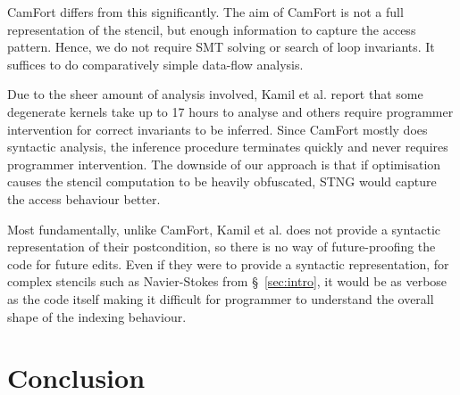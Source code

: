 \documentclass[10pt,preprint]{sigplanconf}
\theoremstyle{definition}
\begin{document}

CamFort differs from this significantly. The aim of CamFort is not a
full representation of the stencil, but enough information to capture the access
pattern. Hence, we do not require SMT solving or search of loop invariants. It
suffices to do comparatively simple data-flow analysis.

Due to the sheer amount of analysis involved, Kamil et al. report that some
degenerate kernels take up to 17 hours to analyse and others require programmer
intervention for correct invariants to be inferred. Since CamFort mostly does
syntactic analysis, the inference procedure terminates quickly and never requires programmer intervention. The downside of our
approach is that if optimisation causes the stencil computation to be heavily
obfuscated, \textsf{STNG} would capture the access behaviour better.

Most fundamentally, unlike CamFort, Kamil et al. does not provide a syntactic
representation of their postcondition, so there is no way of future-proofing the
code for future edits. Even if they were to provide a syntactic representation,
for complex stencils such as Navier-Stokes from \S~\ref{sec:intro}, it would be
as verbose as the code itself making it difficult for programmer to understand
the overall shape of the indexing behaviour.

\section{Conclusion}\label{sec:conclusion}


\end{document}
